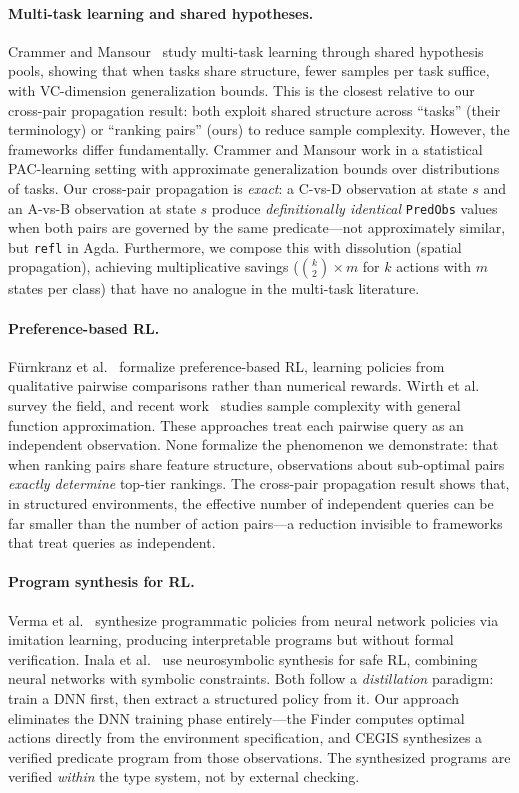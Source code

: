 \documentclass[9pt,a4paper]{article}
\theoremstyle{plain}
\theoremstyle{definition}
\theoremstyle{remark}
\begin{document}
\paragraph{Multi-task learning and shared hypotheses.}  Crammer and Mansour~\cite{Crammer2012} study multi-task learning through shared hypothesis pools, showing that when tasks share structure, fewer samples per task suffice, with VC-dimension generalization bounds.  This is the closest relative to our cross-pair propagation result: both exploit shared structure across ``tasks'' (their terminology) or ``ranking pairs'' (ours) to reduce sample complexity.  However, the frameworks differ fundamentally.  Crammer and Mansour work in a statistical PAC-learning setting with approximate generalization bounds over distributions of tasks.  Our cross-pair propagation is \emph{exact}: a C-vs-D observation at state $s$ and an A-vs-B observation at state $s$ produce \emph{definitionally identical} \texttt{PredObs} values when both pairs are governed by the same predicate---not approximately similar, but \texttt{refl} in Agda.  Furthermore, we compose this with dissolution (spatial propagation), achieving multiplicative savings ($\binom{k}{2} \times m$ for $k$ actions with $m$ states per class) that have no analogue in the multi-task literature.

\paragraph{Preference-based RL.}  F\"urnkranz et al.~\cite{Furnkranz2012} formalize preference-based RL, learning policies from qualitative pairwise comparisons rather than numerical rewards.  Wirth et al.~\cite{Wirth2017} survey the field, and recent work~\cite{Chen2022,Zhu2023} studies sample complexity with general function approximation.  These approaches treat each pairwise query as an independent observation.  None formalize the phenomenon we demonstrate: that when ranking pairs share feature structure, observations about sub-optimal pairs \emph{exactly determine} top-tier rankings.  The cross-pair propagation result shows that, in structured environments, the effective number of independent queries can be far smaller than the number of action pairs---a reduction invisible to frameworks that treat queries as independent.

\paragraph{Program synthesis for RL.}  Verma et al.~\cite{Verma2018} synthesize programmatic policies from neural network policies via imitation learning, producing interpretable programs but without formal verification.  Inala et al.~\cite{Inala2020} use neurosymbolic synthesis for safe RL, combining neural networks with symbolic constraints.  Both follow a \emph{distillation} paradigm: train a DNN first, then extract a structured policy from it.  Our approach eliminates the DNN training phase entirely---the Finder computes optimal actions directly from the environment specification, and CEGIS synthesizes a verified predicate program from those observations.  The synthesized programs are verified \emph{within} the type system, not by external checking.
\end{document}
